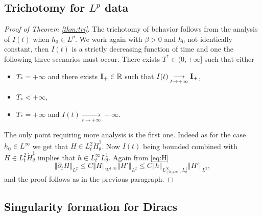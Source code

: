 \documentclass[10pt]{article}
\theoremstyle{definition}
\theoremstyle{remark}
\numberwithin{equation}{section}
\newcommand{\0}{\emptyset}
\newcommand{\bfI}{{\bf I}}
\begin{document}
 
	\subsection{Trichotomy for $L^p$ data}
\begin{proof}[Proof of Theorem \ref{thm:tri}]
The trichotomy of behavior follows from the analysis of $I(t)$ when $h_0\in L^p$. We work again with $\beta>0$ and $h_0$ not identically constant, then $I(t)$ is a strictly decreasing function of time and one the following three scenarios must occur. There exists $T^*\in (0,+\infty]$ such that either
	\begin{itemize}
		\item $T_*=+\infty$ and there exists $\bfI_{+}\in \mathbb{R}$ such that $I(t)\underset{t\to +\infty}{\longrightarrow}\bfI_{+}$,
		\item $T_*<+\infty$,
		\item $T_*=+\infty$ and $I(t)\underset{t\to +\infty}{\longrightarrow}-\infty$.
	\end{itemize}
	The only point requiring more analysis is the first one. Indeed as for the case $h_0\in L^\infty$ we get that $H\in L^2_t\dot{H}^1_\theta$. Now $I(t)$ being bounded combined with $H\in L^2_t\dot{H}^1_\theta$ implies that $h\in L^\infty_t L^1_\theta$. Again from \eqref{eq:H}
	\[
	\left\Vert \partial_t H \right\Vert_{L^2} \leq C\left\Vert H\right\Vert_{W^{1,\infty}}\left\Vert H'\right\Vert_{L^2}\leq C \left\Vert h\right\Vert_{L^\infty_{(0,+\infty)}L^1_\theta}\left\Vert H'\right\Vert_{L^2},
	\]
	and the proof follows as in the previous paragraph.    
\end{proof}


	\subsection{Singularity formation for Diracs}
\end{document}
